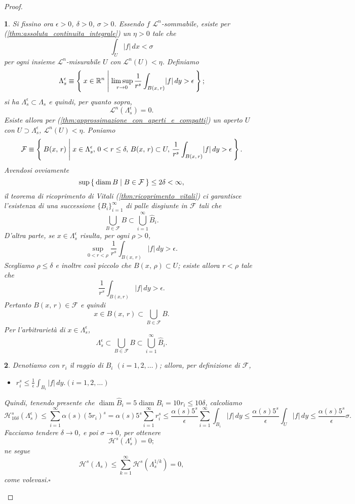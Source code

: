 \documentclass[a4paper,10pt,openright,oneside]{book}
\theoremstyle{theoremstyle}
\theoremstyle{theoremstylewoheader}
\theoremstyle{theoremstyle}
\theoremstyle{proofsecstyle}
\newtheorem{proofsec}{}
\theoremstyle{nonumberplain}
\newtheorem{proof}{Dim.}
\newcommand{\FF}{\ensuremath{\mathcal{F}}}
\newcommand{\RR}{\ensuremath{\mathbb{R}}}
\newcommand{\Leb}{\ensuremath{\mathcal{L}}}
\newcommand{\Haus}{\ensuremath{\mathcal{H}}}
\newcommand{\abs}[1]{\ensuremath{\lvert #1 \rvert}}
\DeclareMathOperator{\diam}{diam}
\renewcommand{\qedsymbol}{\ensuremath{\square}}
\newcommand{\qed}{\unskip\nobreak\hfill\nobreak\hspace{.5em}\qedsymbol}
\newcommand{\mymath}[2]{\begin{itemize}%
  \item[]\hfill\hbox{}\ensuremath{\displaystyle #1}\hfill\ensuremath{\displaystyle #2}%
  \end{itemize}}
\begin{document}
\begin{proof}
\begin{proofsec}
Si fissino ora $\epsilon > 0$, $\delta > 0$, $\sigma > 0$. Essendo $f$ $\Leb^n$-sommabile, esiste per (\ref{thm:assoluta_continuita_integrale}) un $\eta > 0$ tale che
\[
\int_U \abs{f}\, dx < \sigma
\]
per ogni insieme $\Leb^n$-misurabile $U$ con $\Leb^n(U) < \eta$. Definiamo
\[
\Lambda_s^\epsilon \equiv \Set { x \in \RR^n | \limsup_{r \to 0} \frac{1}{r^s} \int_{B(x,\, r)} \abs{f}\, dy > \epsilon };
\]
si ha $\Lambda_s^\epsilon \subset \Lambda_s$ e quindi, per quanto sopra,
\[
\Leb^n(\Lambda_s^\epsilon) = 0.
\]
Esiste allora per (\ref{thm:approssimazione_con_aperti_e_compatti}) un aperto $U$ con $U \supset \Lambda_s^\epsilon$, $\Leb^n(U) < \eta$. Poniamo
\[
\FF \equiv \Set { B(x,\, r) | x \in \Lambda_s^\epsilon,\, 0 < r \le \delta,\, B(x,\, r) \subset U,\, \frac{1}{r^s} \int_{B(x,\, r)} \abs{f}\, dy > \epsilon }.
\]
Avendosi ovviamente
\[
\sup\Set{ \diam B | B \in \FF } \le 2\delta < \infty,
\]
il teorema di ricoprimento di Vitali (\ref{thm:ricoprimento_vitali}) ci garantisce l'esistenza di una successione $\{B_i\}_{i=1}^\infty$ di palle \emph{disgiunte} in $\FF$ tali che
\[
\bigcup_{B \in \FF} B \subset \bigcup_{i=1}^\infty \hat{B}_i.
\]
D'altra parte, se $x \in \Lambda_s^\epsilon$ risulta, per ogni $\rho > 0$,
\[
\sup_{0 < r < \rho} \frac{1}{r^s} \int_{B(x,\, r)} \abs{f}\, dy > \epsilon.
\]
Scegliamo $\rho \le \delta$ e inoltre così piccolo che $B(x,\, \rho) \subset U$; esiste allora $r < \rho$ tale che 
\[
\frac{1}{r^s} \int_{B(x,r)} \abs{f}\, dy > \epsilon.
\]
Pertanto $B(x,\, r) \in \FF$ e quindi
\[
x \in B(x,\, r) \subset \bigcup_{B \in \FF} B.
\]
Per l'arbitrarietà di $x \in \Lambda_s^\epsilon$,
\[
\Lambda_s^\epsilon \subset \bigcup_{B \in \FF} B \subset \bigcup_{i=1}^\infty \hat{B}_i.
\]
\end{proofsec}

\begin{proofsec}
Denotiamo con $r_i$ il raggio di $B_i$ $(i = 1, 2, \ldots)$; allora, per definizione di $\FF$,
\mymath{r_i^s \le \frac{1}{\epsilon} \int_{B_i} \abs{f}\, dy.}{(i = 1, 2, \ldots)} Quindi, tenendo presente che $\diam \hat{B}_i = 5\diam B_i = 10r_i \le 10\delta$, calcoliamo
\[
\Haus_{10\delta}^s (\Lambda_s^\epsilon) \le \sum_{i=1}^\infty \alpha(s)(5r_i)^s = \alpha(s) 5^s \sum_{i=1}^\infty r_i^s \le \frac{\alpha(s)5^s}{\epsilon} \sum_{i=1}^\infty \int_{B_i} \abs{f}\, dy \le \frac{\alpha(s)5^s}{\epsilon} \int_U \abs{f}\, dy \le \frac{\alpha(s)5^s}{\epsilon} \sigma.
\]
Facciamo tendere $\delta \to 0$, e poi $\sigma \to 0$, per ottenere
\[
\Haus^s(\Lambda_s^\epsilon) = 0;
\]
ne segue
\[
\Haus^s(\Lambda_s) \le \sum_{k=1}^\infty \Haus^s(\Lambda_s^{1/k}) = 0,
\]
come volevasi.\qed
\end{proofsec}
\end{proof}
\end{document}
